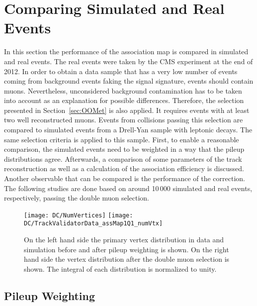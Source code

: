 \chapter{Comparing Simulated and Real Events \label{sec:DC}}

In this section the performance of the association map is compared in simulated and real events. The real events were taken by the CMS experiment at the end of 2012. In order to obtain a data sample that has a very low number of events coming from background events faking the signal signature, events should contain muons. Nevertheless, unconsidered background contamination has to be taken into account as an explanation for possible differences. Therefore, the selection presented in Section~\ref{sec:OOMet} is also applied. It requires events with at least two well reconstructed muons. Events from collisions passing this selection are compared to simulated events from a Drell-Yan sample with leptonic decays. The same selection criteria is applied to this sample. First, to enable a reasonable comparison, the simulated events need to be weighted in a way that the pileup distributions agree. Afterwards, a comparison of some parameters of the track reconstruction as well as a calculation of the association efficiency is discussed. Another observable that can be compared is the performance of the \MET{} correction. The following studies are done based on around 10\,000 simulated and real events, respectively,  passing the double muon selection.

\begin{figure}[Hb]
    \centering
    \texttt{[image: DC/NumVertices]}
    \texttt{[image: DC/TrackValidatorData\_assMap1Q1\_numVtx]}
    \caption[Vertex distribution in data and simulation before and after pileup weighting and after double muon trigger]{On the left hand side the primary vertex distribution in data and simulation before and after pileup weighting is shown. On the right hand side the vertex distribution after the double muon selection is shown. The integral of each distribution is normalized to unity. \label{plot:DCPW}}
\end{figure}

\section{Pileup Weighting \label{sec:DCPW}}

